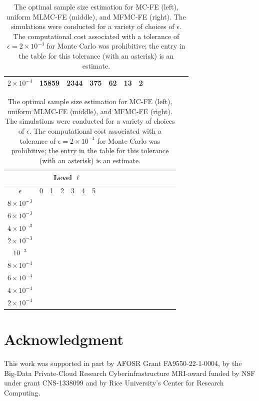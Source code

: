 \documentclass[final,3p,times,11pt]{elsarticle}
\begin{document}
\begin{table}[ht]
{\begin{tabular}{c|c|c|c|c|c|c|c|c|c|c|c|c|}
                \multicolumn{1}{|c|}{$2\times 10^{-4} $}&15859        &2344         &375          &62          &13           &2\\
			\hline
	\end{tabular}
 \qquad
		\begin{tabular}{c|c|c|c|c|c|c|c|c|c|c|c|c|c|c|c|c|c|}
	    \cline{2-7}	
		&\multicolumn{6}{|c|}{ Level $\ell$}\\
			\hline
			\multicolumn{1}{|c|}{$\epsilon$}&0&1&2&3&4&5\\
			\hline
			\multicolumn{1}{|c|}{$8\times 10^{-3} $}&&&&&&\\
			\multicolumn{1}{|c|}{$6\times 10^{-3} $}&&&&&&\\
			\multicolumn{1}{|c|}{$4\times 10^{-3} $}&&&&&&\\
			\multicolumn{1}{|c|}{$2\times 10^{-3} $}&&&&&&\\
			\multicolumn{1}{|c|}{$10^{-3} $}&&&&&&\\
			\multicolumn{1}{|c|}{$8\times 10^{-4} $}&&&&&&\\
                \multicolumn{1}{|c|}{$6\times 10^{-4} $}&&&&&&\\
			\multicolumn{1}{|c|}{$4\times 10^{-4} $}&&&&&&\\
                \multicolumn{1}{|c|}{$2\times 10^{-4} $}&&&&&&\\
			\hline
	\end{tabular}
 
 }
	\caption{The optimal sample size estimation for MC-FE (left), uniform MLMC-FE (middle), and MFMC-FE (right). The simulations were conducted for a variety of choices of $\epsilon$. The computational cost associated with a tolerance of $\epsilon = 2\times 10^{-4}$ for Monte Carlo was prohibitive; the entry in the table for this tolerance (with an asterisk) is an estimate.}
	\label{Tab:SampleSize}
\end{table}


\section{Acknowledgment}\label{sec:Acknowledgment}

This work was supported in part by AFOSR Grant FA9550-22-1-0004,
by the Big-Data Private-Cloud Research Cyberinfrastructure MRI-award funded by NSF under grant CNS-1338099 
and by Rice University's Center for Research Computing. 

%


\end{document}
